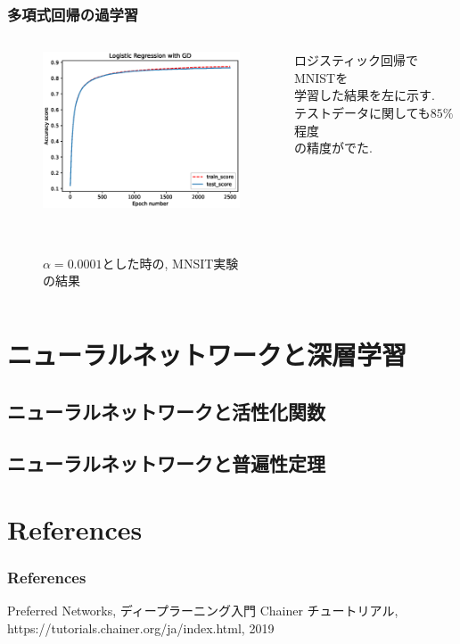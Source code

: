 \documentclass[dvipdfmx,11pt]{beamer}		%
\begin{document}
    \begin{frame}
        \frametitle{多項式回帰の過学習}
        \begin{columns}[t]
            \begin{column}{0.65\textwidth} 
                \begin{figure}
                    \centering
                    \includegraphics[width = 6.8cm]{Image/MNIST_Experiment.eps}
                    \caption{$\alpha = 0.0001$とした時の, MNSIT実験の結果}
              　\end{figure}
            \end{column}
            \begin{column}{0.75\textwidth}
                ロジスティック回帰でMNISTを\\
                学習した結果を左に示す. \\
                テストデータに関しても$85\%$程度\\
                の精度がでた. 
            \end{column}
        \end{columns}
    \end{frame}
    \section{ニューラルネットワークと深層学習}
    \subsection{ニューラルネットワークと活性化関数}
    \subsection{ニューラルネットワークと普遍性定理}
    \section*{References}
    \begin{frame}\frametitle{References}
        \begin{thebibliography}{9}
            \beamertemplatetextbibitems
		     Preferred Networks, ディープラーニング入門 Chainer チュートリアル,
            https://tutorials.chainer.org/ja/index.html, 2019
	    \end{thebibliography}
    \end{frame}
\end{document}

